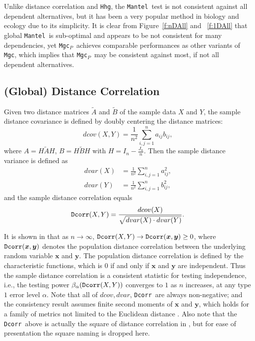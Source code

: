 \documentclass[11pt]{article}
\providecommand{\sct}[1]{{\sc \texttt{#1}}}
\providecommand{\mb}[1]{\boldsymbol{#1}}
\newcommand{\Mgc}{\sct{Mgc}}
\newcommand{\Mgcp}{\sct{Mgc$_P$}}
\newcommand{\Hhg}{\sct{Hhg}}
\newcommand{\Dcorr}{\sct{Dcorr}}
\newcommand{\Mantel}{\sct{Mantel}}
\begin{document}
Unlike distance correlation and \Hhg, the \Mantel~test is not consistent against all dependent alternatives, but it has been a very popular method in biology and ecology due to its simplicity. It is clear from Figure~\ref{f:nDAll} and ~\ref{f:1DAll} that global \Mantel~is sub-optimal and appears to be not consistent for many dependencies, yet \Mgcp~achieves comparable performances as other variants of \Mgc, which implies that \Mgcp~may be consistent against most, if not all dependent alternatives.

\subsection{(Global) Distance Correlation}
\label{appen:dcorr}
Given two distance matrices $\tilde{A}$ and $\tilde{B}$ of the sample data $X$ and $Y$, the sample distance covariance is defined by doubly centering the distance matrices:
\begin{equation}
\label{dcovEqu}
dcov(X,Y)=\frac{1}{n^2}\sum_{i,j=1}^{n}a_{ij}b_{ij},
\end{equation}
where $A=H\tilde{A}H$, $B=H\tilde{B}H$ with $H=I_{n}-\frac{J_{n}}{n}$. Then the sample distance variance is defined as
\begin{align*}
dvar(X) &=\frac{1}{n^2}\sum_{i,j=1}^{n}a_{ij}^{2},\\
dvar(Y) &=\frac{1}{n^2}\sum_{i,j=1}^{n}b_{ij}^{2},
\end{align*}
and the sample distance correlation equals
\begin{equation}
\label{dcorrEqu}
\Dcorr(X,Y)=\frac{dcov(X)}{\sqrt{dvar(X) \cdot dvar(Y)}}.
\end{equation}

It is shown in \cite{SzekelyRizzoBakirov2007} that as $n \rightarrow \infty$, $\Dcorr(X,Y) \rightarrow \Dcorr(\mb{x},\mb{y}) \geq 0$, where $\Dcorr(\mb{x},\mb{y})$ denotes the population distance correlation between the underlying random variable $\mb{x}$ and $\mb{y}$. The population distance correlation is defined by the characteristic functions, which is $0$ if and only if $\mb{x}$ and $\mb{y}$ are independent. Thus the sample distance correlation is a consistent statistic for testing independence, i.e., the testing power $\beta_{\alpha}(\Dcorr(X,Y))$
converges to $1$ as $n$ increases, at any type $1$ error level $\alpha$. Note that all of $dcov, dvar$, \Dcorr~are always non-negative; and the consistency result assumes finite second moments of $\mb{x}$ and $\mb{y}$, which holds for a family of metrics not limited to the Euclidean distance \cite{Lyons2013}. Also note that the \Dcorr~above is actually the square of distance correlation in \cite{SzekelyRizzoBakirov2007}, but for ease of presentation the square naming is dropped here.
\end{document}
